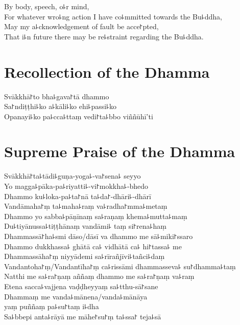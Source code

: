 By body, speech, o꜕r mind,\\
For whatever wro꜕ng action I have co꜕mmitted towards the Bu꜕ddha,\\
May my a꜕cknowledgement of fault be acce꜓pted,\\
That i꜕n future there may be re꜕straint regarding the Bu꜕ddha.

\clearpage

\chapter{Recollection of the Dhamma}%

\begin{leader}
\end{leader}

Svākkhā꜓to bha꜕gava꜓tā dhammo\\
Sa꜓ndiṭṭhi꜕ko a꜕kāli꜕ko ehi꜕passi꜕ko\\
Opanayi꜕ko pa꜕cca꜕ttaṃ vedi꜓ta꜕bbo viññūhī'ti


\chapter{Supreme Praise of the Dhamma}%

\begin{leader}
\end{leader}

Svākkhā꜓ta꜕tādi꜕guṇa-yoga꜕-va꜓sena꜕ seyyo\\
Yo magga꜕pāka-pa꜕riyatti꜕-vi꜓mokkha꜕-bhedo\\
Dhammo ku꜕loka-pa꜕ta꜓nā ta꜕da꜓-dhāri꜕-dhārī\\
Vandāmaha꜓ṃ ta꜕maha꜕raṃ va꜕radha꜓mma꜕metaṃ\\
Dhammo yo sabba꜕pāṇīnaṃ sa꜕raṇaṃ khema꜕mutta꜕maṃ\\
Du꜕tiyānussa꜕tiṭṭhānaṃ vandāmi꜕ taṃ si꜓rena꜕haṃ\\
Dhammassā꜓ha꜕smi dāso/dāsī va dhammo me sā꜕miki꜓ssaro\\
Dhammo dukkhassa꜕ ghātā ca꜕ vidhātā ca꜕ hi꜓tassa꜕ me\\
Dhammassāha꜓ṃ niyyādemi sa꜕rīrañjīvi꜕tañci꜕daṃ\\
Vandantoha꜓ṃ/Vandantīha꜓ṃ ca꜕rissāmi dhammasseva꜕ su꜓dhamma꜕taṃ\\
Natthi me sa꜕ra꜓ṇaṃ aññaṃ dhammo me sa꜕ra꜓ṇaṃ va꜕raṃ\\
Etena sacca꜕vajjena vaḍḍheyyaṃ sa꜕tthu-sā꜓sane\\
Dhammaṃ me vanda꜕mānena/vanda꜕mānāya\\
\vin yaṃ puññaṃ pa꜕su꜓taṃ i꜕dha\\
Sa꜕bbepi anta꜕rāyā me māhe꜓su꜓ṃ ta꜕ssa꜓ teja꜕sā

